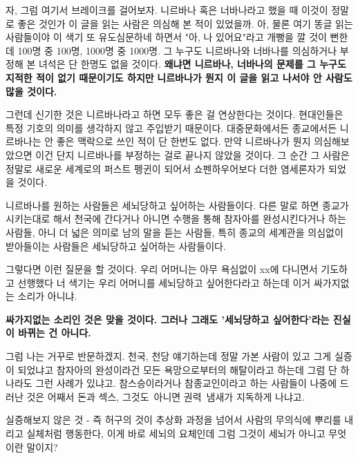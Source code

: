 자, 그럼 여기서 브레이크를 걸어보자.
니르바나 혹은 너바나라고 했을 때 이것이 정말로 좋은 것인가 이 글을 읽는 사람은 의심해 본 적이 있었을까.
아, 물론 여기 똥글 읽는 사람들이야 이 색기 또 유도심문하네 하면서 "아, 나 있어요"라고 개뻥을 깔 것이 뻔한데
100명 중 100명, 1000명 중 1000명. 그 누구도 니르바나와 너바나를 의심하거나 부정해 본 녀석은 단 한명도 없을 것이다.
\textbf{왜냐면 니르바나, 너바나의 문제를 그 누구도 지적한 적이 없기 때문이기도 하지만}
\textbf{니르바나가 뭔지 이 글을 읽고 나서야 안 사람도 많을 것이다.}
\vspace{5mm}

그런데 신기한 것은 니르바나라고 하면 모두 좋은 걸 연상한다는 것이다.
현대인들은 특정 기호의 의미를 생각하지 않고 주입받기 때문이다.
대중문화에서든 종교에서든 니르바나는 안 좋은 맥락으로 쓰인 적이 단 한번도 없다.
만약 니르바나가 뭔지 의심해보았으면 이건 단지 니르바나를 부정하는 걸로 끝나지 않았을 것이다.
그 순간 그 사람은 정말로 새로운 세계로의 퍼스트 펭귄이 되어서 쇼펜하우어보다 더한 염세론자가 되었을 것이다.
\vspace{5mm}

니르바나를 원하는 사람들은 세뇌당하고 싶어하는 사람들이다.
다른 말로 하면 종교가 시키는대로 해서 천국에 간다거나
아니면 수행을 통해 참자아를 완성시킨다거나 하는 사람들,
아니 더 넓은 의미로 남의 말을 듣는 사람들, 특히 종교의 세계관을 의심없이 받아들이는 사람들은
세뇌당하고 싶어하는 사람들이다.
\vspace{5mm}

그렇다면 이런 질문을 할 것이다.
우리 어머니는 아무 욕심없이 xx에 다니면서 기도하고 선행했다
너 색기는 우리 어머니를 세뇌당하고 싶어한다라고 하는데 이거 싸가지없는 소리가 아니냐.
\vspace{5mm}

\textbf{싸가지없는 소리인 것은 맞을 것이다. 그러나 그래도 '세뇌당하고 싶어한다'라는 진실이 바뀌는 건 아니다.}
\vspace{5mm}

그럼 나는 거꾸로 반문하겠지.
천국, 천당 얘기하는데 정말 가본 사람이 있고 그게 실증이 되었냐고
참자아의 완성이라건 모든 욕망으로부터의 해탈이라고 하는데 그럼 단 하나라도 그런 사례가 있냐고.
참스승이라거나 참종교인이라고 하는 사람들이 나중에 드러난 것은 어째서 돈과 섹스, 그것도 아니면 권력 냄새가 지독하게 나냐고.
\vspace{5mm}

실증해보지 않은 것 - 즉 허구의 것이 추상화 과정을 넘어서 사람의 무의식에 뿌리를 내리고 실체처럼 행동한다,
이게 바로 세뇌의 요체인데 그럼 그것이 세뇌가 아니고 무엇이란 말이지?
\vspace{5mm}

